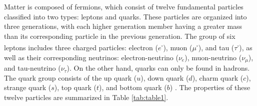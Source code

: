 Matter is composed of fermions, which consist of twelve fundamental particles classified into two types: leptons and quarks. These particles are organized into three generations, with each higher generation member having a greater mass than its corresponding particle in the previous generation. The group of six leptons includes three charged particles: electron ($e$\textsuperscript{-}), muon (${\mu}$\textsuperscript{-}), and tau (${\tau}$\textsuperscript{-}), as well as their corresponding neutrinos: electron-neutrino ($\nu_{e}$), muon-neutrino ($\nu_{\mu}$), and tau-neutrino ($\nu_{\tau}$). On the other hand, quarks can only be found in hadrons. The quark group consists of the up quark ($u$), down quark ($d$), charm quark ($c$), strange quark ($s$), top quark ($t$), and bottom quark ($b$) \cite{griff,thomson_2013}. The properties of these twelve particles are summarized in Table \ref{tab:table1}.


